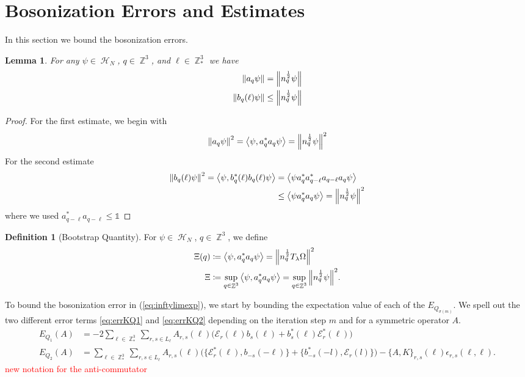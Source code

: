 \documentclass[sn-mathphys, Numbered ,a4paper]{sn-jnl}%
\DeclareMathOperator{\Z}{\mathbb{Z}}
\DeclareMathOperator{\HH}{\mathcal{H}}
\newcommand{\half}{\frac{1}{2}}
\newcommand{\eva}[1]{\left\langle #1 \right\rangle}
\theoremstyle{plain}
\newtheorem{lemma}[theorem]{Lemma}
\theoremstyle{definition}
\newtheorem{definition}[theorem]{Definition}
\theoremstyle{remark}
\theoremstyle{plain}
\theoremstyle{definition}
\theoremstyle{remark}
\begin{document}
\section{Bosonization Errors and Estimates}
In this section we bound the bosonization errors.
\begin{lemma}
	For any $\psi \in \HH_N$, $q \in \Z^3$, and $\ell \in \Z^3_*$ we have 
	\begin{align}
		\norm{a_q\psi}&= \norm{n_q^\half\psi} \\
		\norm{b_q(\ell)\psi}&\leq \norm{n_q^\half\psi}
	\end{align}
\end{lemma}
\begin{proof}
	For the first estimate, we begin with
	\begin{equation}
		\norm{a_q\psi}^2=\eva{\psi,a^*_q a_q\psi}=\norm{n_q^\half\psi}^2
	\end{equation}
For the second estimate
	\begin{align}
		\norm{b_q(\ell)\psi}^2=\eva{\psi,b^*_q(\ell) b_q(\ell)\psi} &=\eva{\psi a^*_q a^*_{q-\ell} a_{q-\ell} a_q\psi}\nonumber\\
		&\leq \eva{\psi a^*_q a_q\psi} = \norm{n_q^\half\psi}^2
	\end{align}
where we used $a^*_{q-\ell}a_{q-\ell}\leq \mathds{1}$ 
\end{proof}
\begin{definition}[Bootstrap Quantity]
 For  $\psi \in \HH_N$, $q\in \Z^3$, we define 
    \begin{align}
        \Xi(q) &\coloneq \expval{\psi, a^*_qa_q\psi} = \norm{n_q^\half T_{\lambda}\Omega}^2\\
        \Xi &\coloneq \sup\limits_{q \in \Z^3}\expval{\psi, a^*_qa_q\psi} = \sup\limits_{q \in \Z^3}\norm{n_q^\half \psi}^2.
    \end{align}
\end{definition}

To bound the bosonization error in (\ref{eq:inftylimexp}), we start by bounding the expectation value of each of the $E_{Q_{\sigma(m)}}$. We spell out the two different error terms \eqref{eq:errKQ1} and \eqref{eq:errKQ2} depending on the iteration step $m$ and for a symmetric operator $A$.
\begin{align}
     E_{Q_1}(A)&=- 2 \sum\limits_{\ell \in \Z^3_*}\sum\limits_{r,s \in L_{\ell}}A_{r,s}(\ell)\Big(\mathcal{E}_{r}(\ell)b_{s}(\ell) + b^*_{s}(\ell)\mathcal{E}^*_{r}(\ell)\Big)\nonumber\\ 
    E_{Q_2}(A) &=
        \sum\limits_{\ell \in \Z^3_*}\sum\limits_{r,s \in L_{\ell}}A_{r,s}(\ell)\Big(\big\{\mathcal{E}^*_{r}(\ell), b_{-s}(-\ell)\big\} + \big\{ b^*_{-s}(-l),\mathcal{E}_r(l)\big\}\Big) - \big\{A,K\big\}_{r,s}(\ell)\epsilon_{r,s}(\ell,\ell) .\nonumber 
\end{align}
\textcolor{red}{new notation for the anti-commutator}
\end{document}
